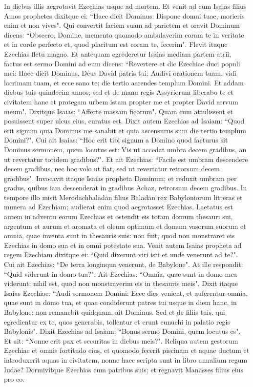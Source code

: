 \begin{biblechapter}  
\verse In diebus illis aegrotavit Ezechias usque ad mortem. Et venit ad eum Isaias filius Amos prophetes dixitque ei: “Haec dicit Dominus: Dispone domui tuae, morieris enim et non vives". 
\verse Qui convertit faciem suam ad parietem et oravit Dominum dicens: 
\verse “Obsecro, Domine, memento quomodo ambulaverim coram te in veritate et in corde perfecto et, quod placitum est coram te, fecerim". Flevit itaque Ezechias fletu magno. 
\verse Et antequam egrederetur Isaias mediam partem atrii, factus est sermo Domini ad eum dicens: 
\verse “Revertere et dic Ezechiae duci populi mei: Haec dicit Dominus, Deus David patris tui: Audivi orationem tuam, vidi lacrimam tuam, et ecce sano te; die tertio ascendes templum Domini. 
\verse Et addam diebus tuis quindecim annos; sed et de manu regis Assyriorum liberabo te et civitatem hanc et protegam urbem istam propter me et propter David servum meum". 
\verse Dixitque Isaias: “Afferte massam ficorum". Quam cum attulissent et posuissent super ulcus eius, curatus est. 
\verse Dixit autem Ezechias ad Isaiam: “Quod erit signum quia Dominus me sanabit et quia ascensurus sum die tertio templum Domini?". 
\verse Cui ait Isaias: “Hoc erit tibi signum a Domino quod facturus sit Dominus sermonem, quem locutus est: Vis ut accedat umbra decem gradibus, an ut revertatur totidem gradibus?". 
\verse Et ait Ezechias: “Facile est umbram descendere decem gradibus, nec hoc volo ut fiat, sed ut revertatur retrorsum decem gradibus".  
\verse Invocavit itaque Isaias propheta Dominum; et reduxit umbram per gradus, quibus iam descenderat in gradibus Achaz, retrorsum decem gradibus. 
\verse In tempore illo misit Merodachbaladan filius Baladan rex Babyloniorum litteras et munera ad Ezechiam; audierat enim quod aegrotasset Ezechias. 
\verse Laetatus est autem in adventu eorum Ezechias et ostendit eis totam domum thesauri sui, argentum et aurum et aromata et oleum optimum et domum vasorum suorum et omnia, quae inventa sunt in thesauris suis: non fuit, quod non monstraret eis Ezechias in domo sua et in omni potestate sua. 
\verse Venit autem Isaias propheta ad regem Ezechiam dixitque ei: “Quid dixerunt viri isti et unde venerunt ad te?". Cui ait Ezechias: “De terra longinqua venerunt, de Babylone". 
\verse At ille respondit: “Quid viderunt in domo tua?". Ait Ezechias: “Omnia, quae sunt in domo mea viderunt; nihil est, quod non monstraverim eis in thesauris meis". 
\verse Dixit itaque Isaias Ezechiae: “Audi sermonem Domini: 
\verse Ecce dies venient, et auferentur omnia, quae sunt in domo tua, et quae condiderunt patres tui usque in diem hanc, in Babylone; non remanebit quidquam, ait Dominus. 
\verse Sed et de filiis tuis, qui egredientur ex te, quos generabis, tollentur et erunt eunuchi in palatio regis Babylonis". 
\verse Dixit Ezechias ad Isaiam: “Bonus sermo Domini, quem locutus es". Et ait: “Nonne erit pax et securitas in diebus meis?". 
\verse Reliqua autem gestorum Ezechiae et omnis fortitudo eius, et quomodo fecerit piscinam et aquae ductum et introduxerit aquas in civitatem, nonne haec scripta sunt in libro annalium regum Iudae? 
\verse Dormivitque Ezechias cum patribus suis; et regnavit Manasses filius eius pro eo. 
\end{biblechapter}

